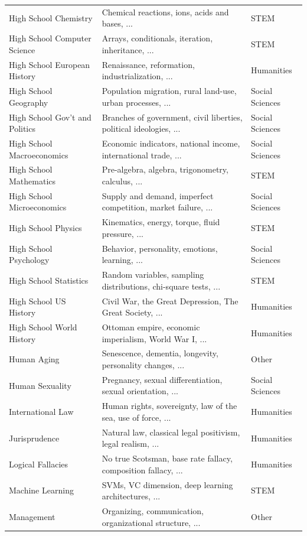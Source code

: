 \begin{table}[h]
{\begin{tabular}{lll}
High School Chemistry & Chemical reactions, ions, acids and bases, ... & STEM \\
High School Computer Science & Arrays, conditionals, iteration, inheritance, ... & STEM \\
High School European History & Renaissance, reformation, industrialization, ... & Humanities \\
High School Geography & Population migration, rural land-use, urban processes, ... & Social Sciences \\
High School Gov't and Politics & Branches of government, civil liberties, political ideologies, ... & Social Sciences \\
High School Macroeconomics & Economic indicators, national income, international trade, ... & Social Sciences \\
High School Mathematics & Pre-algebra, algebra, trigonometry, calculus, ... & STEM \\
High School Microeconomics & Supply and demand, imperfect competition, market failure, ... & Social Sciences \\
High School Physics & Kinematics, energy, torque, fluid pressure, ... & STEM \\
High School Psychology & Behavior, personality, emotions, learning, ... & Social Sciences \\
High School Statistics & Random variables, sampling distributions, chi-square tests, ...  & STEM \\
High School US History & Civil War, the Great Depression, The Great Society, ... & Humanities \\
High School World History & Ottoman empire, economic imperialism, World War I, ... & Humanities \\
Human Aging & Senescence, dementia, longevity, personality changes, ... & Other \\
Human Sexuality & Pregnancy, sexual differentiation, sexual orientation, ... & Social Sciences \\
International Law & Human rights, sovereignty, law of the sea, use of force, ... & Humanities \\
Jurisprudence & Natural law, classical legal positivism, legal realism, ... & Humanities \\
Logical Fallacies & No true Scotsman, base rate fallacy, composition fallacy, ... & Humanities \\
Machine Learning & SVMs, VC dimension, deep learning architectures, ... & STEM \\
Management & Organizing, communication, organizational structure, ... & Other \\

\end{tabular}}
\end{table}
